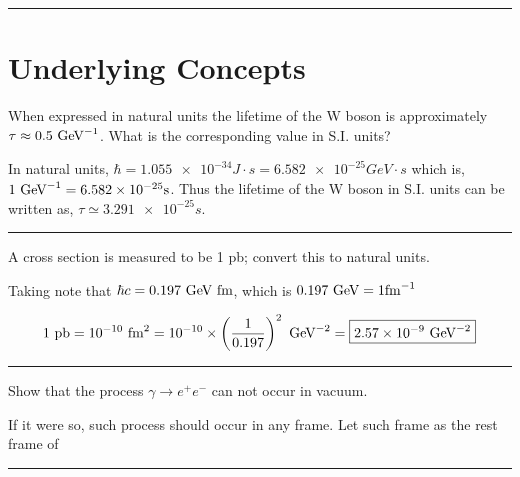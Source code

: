 \noindent\rule{7in}{2.8pt}
\section{Underlying Concepts}
\begin{problem}{2.1}
When expressed in natural units the lifetime of the W boson is approximately $\tau \approx 0.5\text{ GeV}^{-1}$. What is the corresponding value in S.I. units?
\end{problem}
\begin{solution}
In natural units, $\hbar = \num{1.055e-34}\unit{J\cdot s} = \num{6.582e-25} \unit{GeV\cdot s}$ which is, $1 \GeV^{-1} = \num{6.582e-25} \unit{s}$.
Thus the lifetime of the W boson in S.I. units can be written as, $\boxed{\tau \simeq \num{3.291e-25} \unit{s}}$.\\
\end{solution} 
\noindent\rule{7in}{1.5pt}


\begin{problem}{2.2}
A cross section is measured to be 1 pb; convert this to natural units.
\end{problem}
\begin{solution}
Taking note that $\hbar c = 0.197 \text{ GeV} \text{ fm}$, which is $0.197 \GeV = 1 \unit{\femto\metre}^{-1}$

\begin{align*}
    1 \text{ pb} = 10^{-10} \text{ fm}^2 = 10^{-10} \times \left( \frac{1}{0.197} \right)^2 \text{ GeV}^{-2} = \boxed{\num{2.57e-9}\text{ GeV}^{-2}}
\end{align*}
\end{solution} 
\noindent\rule{7in}{1.5pt}


\begin{problem}{2.3}
Show that the process $\gamma\to e^+ e^-$ can not occur in vacuum.
\end{problem}
\begin{solution}
If it were so, such process should occur in any frame. Let such frame as the rest frame of
\end{solution} 
\noindent\rule{7in}{1.5pt}


